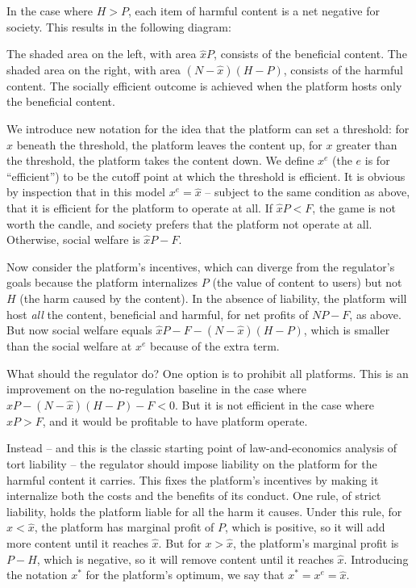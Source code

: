 In the case where $H>P$, each item of harmful content is a net negative for society. This results in the following diagram:


The shaded area on the left, with area $\hat{x}P$, consists of the beneficial content. The shaded area on the right, with area $(N - \hat{x})(H-P)$, consists of the harmful content. The socially efficient outcome is achieved when the platform hosts only the beneficial content.

We introduce new notation for the idea that the platform can set a threshold: for $x$ beneath the threshold, the platform leaves the content up, for $x$ greater than the threshold, the platform takes the content down. We define $x^e$ (the $e$ is for ``efficient'') to be the cutoff point at which the threshold is efficient. It is obvious by inspection that in this model $x^e = \hat{x}$ -- subject to the same condition as above, that it is efficient for the platform to operate at all. If $\hat{x}P < F$, the game is not worth the candle, and society prefers that the platform not operate at all. Otherwise, social welfare is $\hat{x}P - F$.

Now consider the platform's incentives, which can diverge from the regulator's goals because the platform internalizes $P$ (the value of content to users) but not $H$ (the harm caused by the content).  In the absence of liability, the platform will host \emph{all} the content, beneficial and harmful, for net profits of $NP - F$, as above. But now social welfare equals $\hat{x}P - F - (N - \hat{x})(H - P)$, which is smaller than the social welfare at $x^e$ because of the extra term.

What should the regulator do? One option is to prohibit all platforms. This is an improvement on the no-regulation baseline in the case where $\hat{x}P - (N - \hat{x})(H - P) - F < 0$. But it is not efficient in the case where $\hat{x}P > F$, and it would be profitable to have  platform operate.

Instead -- and this is the classic starting point of law-and-economics analysis of tort liability -- the regulator should impose liability on the platform for the harmful content it carries. This fixes the platform's incentives by making it internalize both the costs and the benefits of its conduct. One rule, of strict liability, holds the platform liable for all the harm it causes. Under this rule, for $x <\hat{x}$, the platform has marginal profit of $P$, which is positive, so it will add more content until it reaches $\hat{x}$. But for $x > \hat{x}$, the platform's marginal profit is $P - H$, which is negative, so it will remove content until it reaches $\hat{x}$.  Introducing the notation $x^*$ for the platform's optimum, we say that $x^* = x^e = \hat{x}$.


